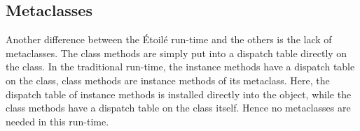 \subsection{Metaclasses}

Another difference between the \'Etoil\'e run-time and the others is the lack of metaclasses. The class methods are simply put into a dispatch table directly on the class. In the traditional run-time, the instance methods have a dispatch table on the class, class methods are instance methods of its metaclass. Here, the dispatch table of instance methods is installed directly into the object, while the class methods have a dispatch table on the class itself. Hence no metaclasses are needed in this run-time.

